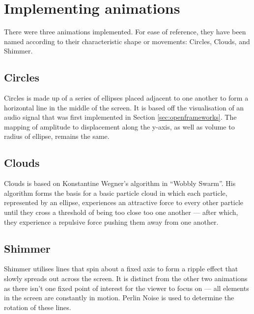 \documentclass[../initial_thesis.tex]{subfiles}
\begin{document}
\section{Implementing animations}
There were three animations implemented. For ease of reference, they have been named according to their characteristic shape or movements: Circles, Clouds, and Shimmer.

\subsection{Circles}
Circles is made up of a series of ellipses placed adjacent to one another to form a horizontal line in the middle of the screen. It is based off the visualisation of an audio signal that was first implemented in Section \ref{sec:openframeworks}. The mapping of amplitude to displacement along the y-axis, as well as volume to radius of ellipse, remains the same.

\subsection{Clouds}
Clouds is based on Konstantine Wegner's algorithm in ``Wobbly Swarm''. His algorithm forms the basis for a basic particle cloud in which each particle, represented by an ellipse, experiences an attractive force to every other particle until they cross a threshold of being too close too one another --- after which, they experience a repulsive force pushing them away from one another.

\subsection{Shimmer}
Shimmer utilises lines that spin about a fixed axis to form a ripple effect that slowly spreads out across the screen. It is distinct from the other two animations as there isn't one fixed point of interest for the viewer to focus on --- all elements in the screen are constantly in motion. Perlin Noise is used to determine the rotation of these lines.
\end{document}
